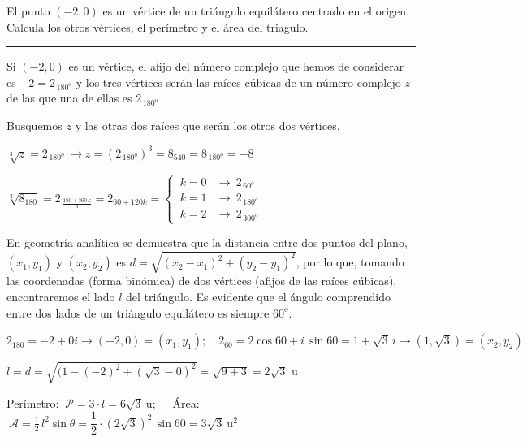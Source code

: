\begin{miejercicio}

El punto $(-2,0)$ es un vértice de un triángulo equilátero centrado en el origen. Calcula los otros vértices, el perímetro y el área del triagulo.

\rule{250pt}{0.5pt}

\vspace{2mm} Si $(-2,0)$  es un vértice, el afijo del número complejo que hemos de considerar es $-2=2_{\, 180^o}$ y los tres vértices serán las raíces cúbicas de un número complejo $z$ de las que una de ellas es $2_{\, 180^o}$

\vspace{2mm} Busquemos $z$ y las otras dos raíces que serán los otros dos vértices. 

\vspace{2mm} $\sqrt[3]{z}=2_{\, 180^o} \ \to z=(2_{\, 180^o})^3=8_{540}=8_{\, 180^o}=-8$ 

\vspace{2mm} $\sqrt[3]{8_{180}} = 2_{\, \frac{180+360\, k}{3} } = 
2_{60+120k}=
\begin{cases}  \ k=0 &\to \ 2_{\, 60^o} \\  \ k=1 &\to \ 2_{\, 180^o} \\  \ k=2 &\to \ 2_{\, 300^o} \end{cases}$ 

\vspace{2mm}  En geometría analítica se demuestra que la distancia entre dos puntos del plano, $(x_1,y_1)$ y $(x_2,y_2)$ es $d=\sqrt{(x_2-x_1)^2+(y_2-y_1)^2}$, por lo que, tomando las coordenadas (forma binómica) de dos vértices (afijos de las raíces cúbicas), encontraremos el lado $l$ del triángulo. Es evidente que el ángulo comprendido entre dos lados de un triángulo equilátero es siempre $60^o$. 

\vspace{2mm} $2_{180}=-2+0i\to (-2,0)=(x_1,y_1); \quad 2_{60}=2\cos 60+i\, \sin 60=1+\sqrt{3}\, i\to (1,\sqrt{3})=(x_2,y_2)$

\vspace{2mm} $l=d=\sqrt{(1-(-2)^2+(\sqrt{3}-0)^2}=\sqrt{9+3}=2\sqrt{3}$ u

\vspace{2mm} Perímetro: $\ \mathcal P=3\cdot l=6\sqrt{3}\ \mathrm{u};\quad$  Área: $\ \mathcal A=\frac 1 2\,  l^2 \sin \theta=\dfrac 1 2 \cdot (2\sqrt{3})^2 \, \sin 60 = 3\sqrt{3}\ \mathrm{u}^2$


\end{miejercicio}

